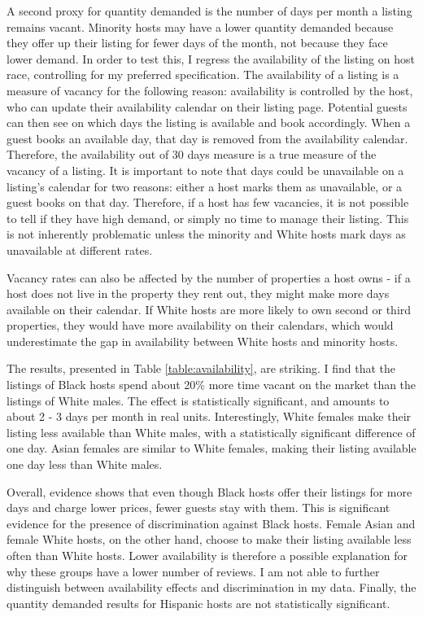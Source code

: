 A second proxy for quantity demanded is the number of days per month a listing remains vacant. Minority hosts may have a lower quantity demanded because they offer up their listing for fewer days of the month, not because they face lower demand. In order to test this, I regress the availability of the listing on host race, controlling for my preferred specification. The availability of a listing is a measure of vacancy for the following reason: availability is controlled by the host, who can update their availability calendar on their listing page. Potential guests can then see on which days the listing is available and book accordingly. When a guest books an available day, that day is removed from the availability calendar. Therefore, the availability out of 30 days measure is a true measure of the vacancy of a listing. It is  important to note that days could be unavailable on a listing's calendar for two reasons: either a host marks them as unavailable, or a guest books on that day. Therefore, if a host has few vacancies, it is not possible to tell if they have high demand, or simply no time to manage their listing. This is not inherently problematic unless the minority and White hosts mark days as unavailable at different rates. 

Vacancy rates can also be affected by the number of properties a host owns - if a host does not live in the property they rent out, they might make more days available on their calendar. If White hosts are more likely to own second or third properties, they would have more availability on their calendars, which would underestimate the gap in availability between White hosts and minority hosts.  

The results, presented in Table \ref{table:availability}, are striking. I find that the listings of Black hosts spend about 20\% more time vacant on the market than the listings of White males. The effect is statistically significant, and amounts to about 2 - 3 days per month in real units. Interestingly, White females make their listing less available than White males, with a statistically significant difference of one day. Asian females are similar to White females, making their listing available one day less than White males. 

Overall, evidence shows that even though Black hosts offer their listings for more days and charge lower prices, fewer guests stay with them. This is significant evidence for the presence of discrimination against Black hosts. Female Asian and female White hosts, on the other hand, choose to make their listing available less often than White hosts. Lower availability is therefore a possible explanation for why these groups have a lower number of reviews. I am not able to further distinguish between availability effects and discrimination in my data. Finally, the quantity demanded results for Hispanic hosts are not statistically significant.














